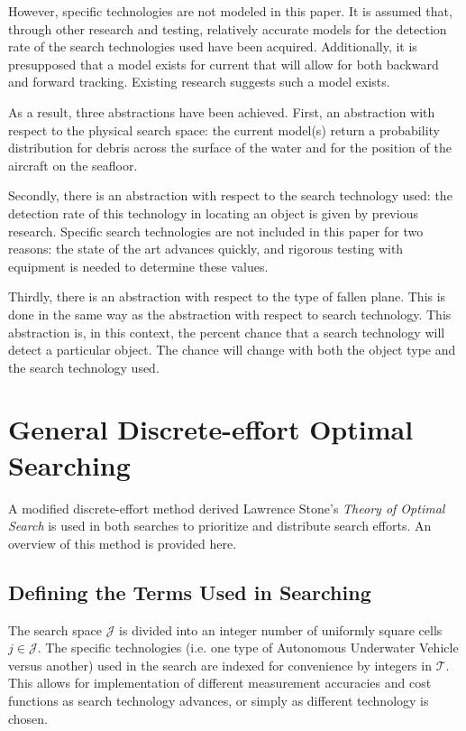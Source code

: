 \documentclass[a4paper]{article}
\begin{document}
However, specific technologies are not modeled in this paper. It is assumed that, through other research and testing, relatively accurate models for the detection rate of the search technologies used have been acquired. Additionally, it is presupposed that a model exists for current that will allow for both backward and forward tracking. Existing research suggests such a model exists.

As a result, three abstractions have been achieved. First, an abstraction with respect to the physical search space: the current model(s) return a probability distribution for debris across the surface of the water and for the position of the aircraft on the seafloor. 

Secondly, there is an abstraction with respect to the search technology used: the detection rate of this technology in locating an object is given by previous research. Specific search technologies are not included in this paper for two reasons: the state of the art advances quickly, and rigorous testing with equipment is needed to determine these values. 

Thirdly, there is an abstraction with respect to the type of fallen plane. This is done in the same way as the abstraction with respect to search technology. This abstraction is, in this context, the percent chance that a search technology will detect a particular object. The chance will change with both the object type and the search technology used.



\section{General Discrete-effort Optimal Searching}

A modified discrete-effort method derived Lawrence Stone's \textit{Theory of Optimal Search} is used in both searches to prioritize and distribute search efforts. An overview of this method is provided here. 

\subsection{Defining the Terms Used in Searching}

The search space $\mathcal{J}$ is divided into an integer number of uniformly square cells $j\in\mathcal{J}$. The specific technologies (i.e. one type of Autonomous Underwater Vehicle versus another) used in the search are indexed for convenience by integers in $\mathcal{T}$. This allows for implementation of different measurement accuracies and cost functions as search technology advances, or simply as different technology is chosen. 
\end{document}
